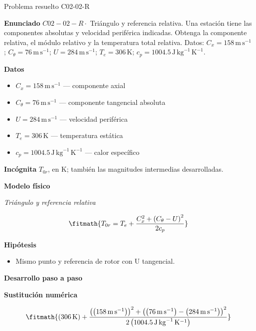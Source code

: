 \documentclass[10pt,openany]{book}
\begin{document}
\begin{studiumworked}{Problema resuelto C02-02-R}


\noindent\textbf{Enunciado}
\(C02-02-R \cdot\) Triángulo y referencia relativa. Una estación tiene las componentes absolutas y velocidad periférica indicadas. Obtenga la componente relativa, el módulo relativo y la temperatura total relativa. Datos: \(C_x=158\, \mathrm{m}\,\mathrm{s}^{-1}\); \(C_\theta=76\, \mathrm{m}\,\mathrm{s}^{-1}\); \(U=284\, \mathrm{m}\,\mathrm{s}^{-1}\); \(T_e=306\, \mathrm{K}\); \(c_p=1004.5\, \mathrm{J}\,\mathrm{kg}^{-1}\,\mathrm{K}^{-1}\).

\noindent\textbf{Datos}
\begin{itemize}
\item $C_x = 158\,\mathrm{m}\,\mathrm{s}^{-1}$ — componente axial
\item $C_\theta = 76\,\mathrm{m}\,\mathrm{s}^{-1}$ — componente tangencial absoluta
\item $U = 284\,\mathrm{m}\,\mathrm{s}^{-1}$ — velocidad periférica
\item $T_e = 306\,\mathrm{K}$ — temperatura estática
\item $c_p = 1004.5\,\mathrm{J}\,\mathrm{kg}^{-1}\,\mathrm{K}^{-1}$ — calor específico
\end{itemize}

\noindent\textbf{Incógnita}
$T_{0r}$, en $\mathrm{K}$; también las magnitudes intermedias desarrolladas.

\noindent\textbf{Modelo físico}

\noindent\textit{Triángulo y referencia relativa}

\[
\fitmath{T_{0r}=T_e + \frac{C_x^{2} + \left(C_\theta - U\right)^{2}}{2 c_p}}
\]

\noindent\textbf{Hipótesis}
\begin{itemize}
\item Mismo punto y referencia de rotor con U tangencial.
\end{itemize}

\noindent\textbf{Desarrollo paso a paso}



\noindent\textbf{Sustitución numérica}

\[
\fitmath{\left(306\,\mathrm{K}\right) + \frac{\left(\left(158\,\mathrm{m}\,\mathrm{s}^{-1}\right)\right)^{2} + \left(\left(76\,\mathrm{m}\,\mathrm{s}^{-1}\right) - \left(284\,\mathrm{m}\,\mathrm{s}^{-1}\right)\right)^{2}}{2 \left(1004.5\,\mathrm{J}\,\mathrm{kg}^{-1}\,\mathrm{K}^{-1}\right)}}
\]


\end{studiumworked}
\end{document}
